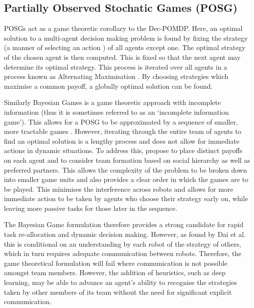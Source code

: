 \documentclass[.../main.tex]{subfiles}
\begin{document}
\subsection{Partially Observed Stochatic Games (POSG)} \label{sec::Stochastic_Games}

POSGs act as a game theoretic corollary to the Dec-POMDP. Here, an optimal solution to a multi-agent
decision making problem is found by
fixing the strategy (a manner of selecting an action \cite{Rizk2018}) of all agents
except one. The optimal strategy of the chosen agent is then computed. This is fixed so that the
next agent may determine its optimal strategy. This process is iterated over all agents in a process
known as Alternating Maximisation \cite{Ray2010}. By choosing strategies which maximise
a common payoff, a globally optimal solution can be found.

Similarly Bayesian Games is a game theoretic approach with incomplete information (thus it is
sometimes referred to as an `incomplete information game’). This allows for a POSG to be
approximated by a sequence of smaller, more tractable games
\cite{Emery-Montemerlo}. However, iterating through the entire team of agents to
find an optimal solution is a lengthy process and does not allow for immediate actions in dynamic
situations. To address this, \cite{Ray2010} propose to place distinct payoffs on each
agent and to consider team formation based on social hierarchy as well as preferred partners. This
allows the complexity of the problem to be broken down into smaller game units and also provides a
clear order in which the games are to be played. This minimises the interference across robots and
allows for more immediate action to be taken by agents who choose their strategy early on, while
leaving more passive tasks for those later in the sequence. 

The Bayesian Game formulation therefore provides a strong candidate for rapid task re-allocation and
dynamic decision making. However, as found by Dai et al. \cite{Dai2018} this is
conditional on an understanding by each robot of the strategy of others, which in turn requires
adequate communication between robots. Therefore, the game theoretical formulation will fail where
communication is not possible amongst team members. However, the addition of heuristics, such as
deep learning, may be able to advance an agent’s ability to recognise the strategies taken by other
members of its team without the need for significant explicit communication.

\end{document}
